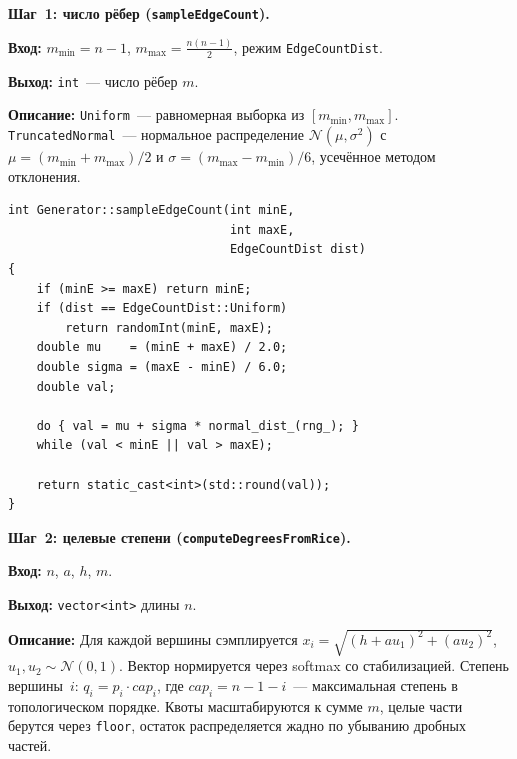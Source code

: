 \textbf{Шаг~1: число рёбер (\texttt{sampleEdgeCount}).}

\textbf{Вход:} $m_{\min} = n-1$, $m_{\max} = \frac{n(n-1)}{2}$,
режим \texttt{EdgeCountDist}.

\textbf{Выход:} \texttt{int}~--- число рёбер $m$.

\textbf{Описание:} \texttt{Uniform}~--- равномерная выборка из
$[m_{\min}, m_{\max}]$. \texttt{TruncatedNormal}~--- нормальное
распределение $\mathcal{N}(\mu, \sigma^2)$ с $\mu = (m_{\min} + m_{\max})/2$
и $\sigma = (m_{\max} - m_{\min})/6$, усечённое методом отклонения.

\begin{lstlisting}[style=cppstyle, caption={Выбор числа рёбер (Generator.cc)}]
int Generator::sampleEdgeCount(int minE, 
                               int maxE, 
                               EdgeCountDist dist) 
{
    if (minE >= maxE) return minE;
    if (dist == EdgeCountDist::Uniform)
        return randomInt(minE, maxE);
    double mu    = (minE + maxE) / 2.0;
    double sigma = (maxE - minE) / 6.0;
    double val;
    
    do { val = mu + sigma * normal_dist_(rng_); }
    while (val < minE || val > maxE);
    
    return static_cast<int>(std::round(val));
}
\end{lstlisting}

\textbf{Шаг~2: целевые степени (\texttt{computeDegreesFromRice}).}

\textbf{Вход:} $n$, $a$, $h$, $m$.

\textbf{Выход:} \texttt{vector<int>} длины $n$.

\textbf{Описание:} Для каждой вершины сэмплируется
$x_i = \sqrt{(h + au_1)^2 + (au_2)^2}$, $u_1, u_2 \sim \mathcal{N}(0,1)$.
Вектор нормируется через softmax со стабилизацией. Степень вершины~$i$:
$q_i = p_i \cdot \mathit{cap}_i$, где $\mathit{cap}_i = n - 1 - i$~---
максимальная степень в топологическом порядке. Квоты масштабируются к
сумме $m$, целые части берутся через \texttt{floor}, остаток
распределяется жадно по убыванию дробных частей.

